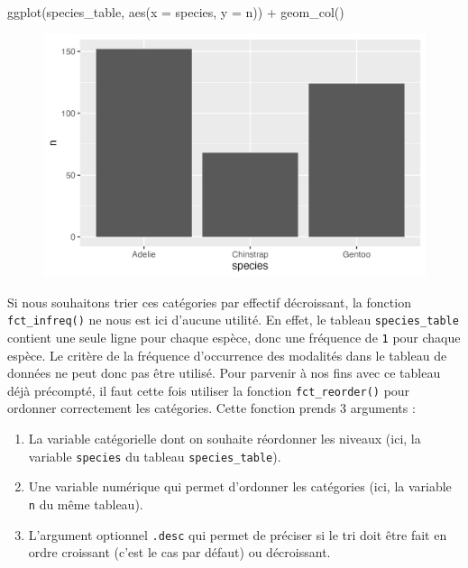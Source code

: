 \documentclass[
  letterpaper,
  DIV=11,
  numbers=noendperiod]{scrreprt}
\newenvironment{Shaded}{\begin{snugshade}}{\end{snugshade}}
\newcommand{\AttributeTok}[1]{\textcolor[rgb]{0.40,0.45,0.13}{#1}}
\newcommand{\FunctionTok}[1]{\textcolor[rgb]{0.28,0.35,0.67}{#1}}
\newcommand{\NormalTok}[1]{\textcolor[rgb]{0.00,0.23,0.31}{#1}}
\newcommand{\SpecialCharTok}[1]{\textcolor[rgb]{0.37,0.37,0.37}{#1}}
\providecommand{\tightlist}{%
  \setlength{\itemsep}{0pt}\setlength{\parskip}{0pt}}\usepackage{longtable,booktabs,array}
\begin{document}
\begin{Shaded}
\begin{Highlighting}[]
\FunctionTok{ggplot}\NormalTok{(species\_table, }\FunctionTok{aes}\NormalTok{(}\AttributeTok{x =}\NormalTok{ species, }\AttributeTok{y =}\NormalTok{ n)) }\SpecialCharTok{+}
  \FunctionTok{geom\_col}\NormalTok{()}
\end{Highlighting}
\end{Shaded}

\begin{figure}[H]

{\centering \includegraphics{./03-visualization_files/figure-pdf/unnamed-chunk-42-1.png}

}

\end{figure}

Si nous souhaitons trier ces catégories par effectif décroissant, la
fonction \texttt{fct\_infreq()} ne nous est ici d'aucune utilité. En
effet, le tableau \texttt{species\_table} contient une seule ligne pour
chaque espèce, donc une fréquence de \texttt{1} pour chaque espèce. Le
critère de la fréquence d'occurrence des modalités dans le tableau de
données ne peut donc pas être utilisé. Pour parvenir à nos fins avec ce
tableau déjà précompté, il faut cette fois utiliser la fonction
\texttt{fct\_reorder()} pour ordonner correctement les catégories. Cette
fonction prends 3 arguments :

\begin{enumerate}
\def\labelenumi{\arabic{enumi}.}
\tightlist
\item
  La variable catégorielle dont on souhaite réordonner les niveaux (ici,
  la variable \texttt{species} du tableau \texttt{species\_table}).
\item
  Une variable numérique qui permet d'ordonner les catégories (ici, la
  variable \texttt{n} du même tableau).
\item
  L'argument optionnel \texttt{.desc} qui permet de préciser si le tri
  doit être fait en ordre croissant (c'est le cas par défaut) ou
  décroissant.
\end{enumerate}
\end{document}
